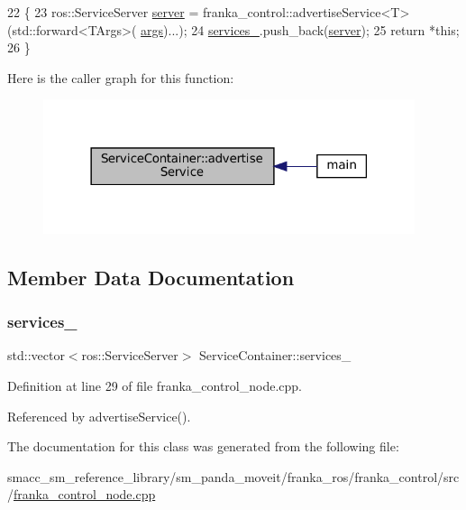 \begin{DoxyCode}
22                                                       \{
23     ros::ServiceServer \hyperlink{namespaceinteractive__marker_a0913a920340099e56f9b000d508380eb}{server} = franka\_control::advertiseService<T>(std::forward<TArgs>(
      \hyperlink{namespacegenerate__debs_a75f9143e38df82d83b2e8a6f99cae02c}{args})...);
24     \hyperlink{classServiceContainer_a0c4a14a2e00d160ba242062dc7dc7caa}{services\_}.push\_back(\hyperlink{namespaceinteractive__marker_a0913a920340099e56f9b000d508380eb}{server});
25     \textcolor{keywordflow}{return} *\textcolor{keyword}{this};
26   \}
\end{DoxyCode}
Here is the caller graph for this function\+:
\nopagebreak
\begin{figure}[H]
\begin{center}
\leavevmode
\includegraphics[width=309pt]{classServiceContainer_a46e347a74b89b0001362544711b18862_icgraph}
\end{center}
\end{figure}


\subsection{Member Data Documentation}
\mbox{\label{classServiceContainer_a0c4a14a2e00d160ba242062dc7dc7caa}} 
\subsubsection{\texorpdfstring{services\+\_\+}{services\_}}
{\footnotesize\ttfamily std\+::vector$<$ros\+::\+Service\+Server$>$ Service\+Container\+::services\+\_\+\hspace{0.3cm}{\ttfamily [private]}}



Definition at line 29 of file franka\+\_\+control\+\_\+node.\+cpp.



Referenced by advertise\+Service().



The documentation for this class was generated from the following file\+:\begin{DoxyCompactItemize}
\item 
smacc\+\_\+sm\+\_\+reference\+\_\+library/sm\+\_\+panda\+\_\+moveit/franka\+\_\+ros/franka\+\_\+control/src/\hyperlink{franka__control__node_8cpp}{franka\+\_\+control\+\_\+node.\+cpp}\end{DoxyCompactItemize}
